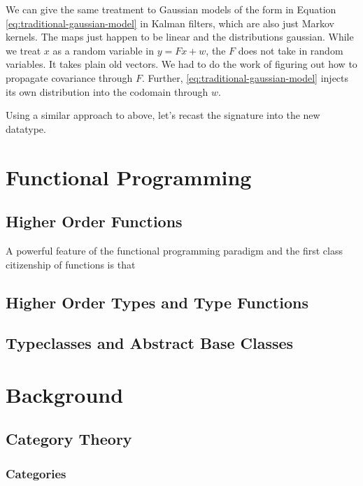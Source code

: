 We can give the same treatment to Gaussian models of the form in Equation \ref{eq:traditional-gaussian-model} in Kalman filters, which are also just Markov kernels. The maps just happen to be linear and the distributions gaussian.
While we treat $x$ as a random variable in $y = Fx + w$, the $F$ does not take in random variables.
It takes plain old vectors.
We had to do the work of figuring out how to propagate covariance through $F$.
Further, \ref{eq:traditional-gaussian-model} injects its own distribution into the codomain through $w$.


Using a similar approach to above, let's recast the signature into the new datatype.


\chapter{Functional Programming}
\section{Higher Order Functions}

A powerful feature of the functional programming paradigm and the first class citizenship of functions is that 

\section{Higher Order Types and Type Functions}
\section{Typeclasses and Abstract Base Classes}

\chapter{Background}
\section{Category Theory}
\subsection{Categories}
